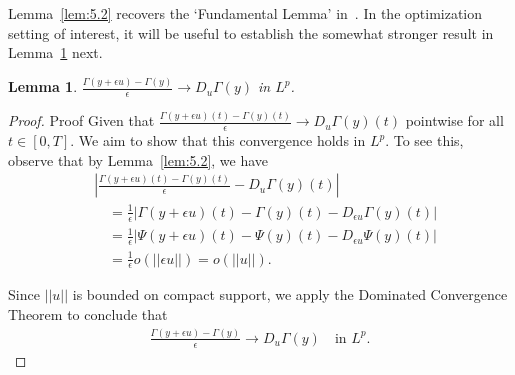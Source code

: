\documentclass[11pt,leqno]{amsart}
\newtheorem{lemma}{Lemma}
\begin{document}
Lemma~\ref{lem:5.2} recovers the `Fundamental Lemma' in~\cite{MM}. In the optimization setting of interest, it will be useful to establish the somewhat stronger result in Lemma~\ref{lem:5.3} next.

\begin{lemma}\label{lem:5.3}
    $\frac{\Gamma(y+\epsilon u)-\Gamma(y)}{\epsilon}\to D_u\Gamma(y)$ in $L^p$.
\end{lemma}

\begin{proof}{Proof}%
    Given that $\frac{\Gamma(y+\epsilon u)(t)-\Gamma(y)(t)}{\epsilon}\to D_u\Gamma(y)(t)$ pointwise for all $t\in[0,T]$. We aim to show that this convergence holds in $L^p$. To see this, observe that by Lemma~\ref{lem:5.2}, we have
\begin{align*}
    &\left| \frac{\Gamma(y+\epsilon u)(t)-\Gamma(y)(t)}{\epsilon}- D_u\Gamma(y)(t)\right|\\
    &\quad=\frac{1}{\epsilon}\left|\Gamma(y+\epsilon u)(t)-\Gamma(y)(t)- D_{\epsilon u}\Gamma(y)(t)\right|\\
    &\quad=\frac{1}{\epsilon}\left|\Psi(y+\epsilon u)(t)-\Psi(y)(t)- D_{\epsilon u}\Psi(y)(t)\right|\\
    &\quad=\frac{1}{\epsilon}o(||\epsilon u||)=o(|| u||).
\end{align*}  

Since $|| u||$ is bounded on compact support, we apply the Dominated Convergence Theorem to conclude that
\begin{align*}
    \frac{\Gamma(y+\epsilon u)-\Gamma(y)}{\epsilon}\to D_u\Gamma(y)\quad\text{in } L^p.
\end{align*}
 
\end{proof}
\end{document}
